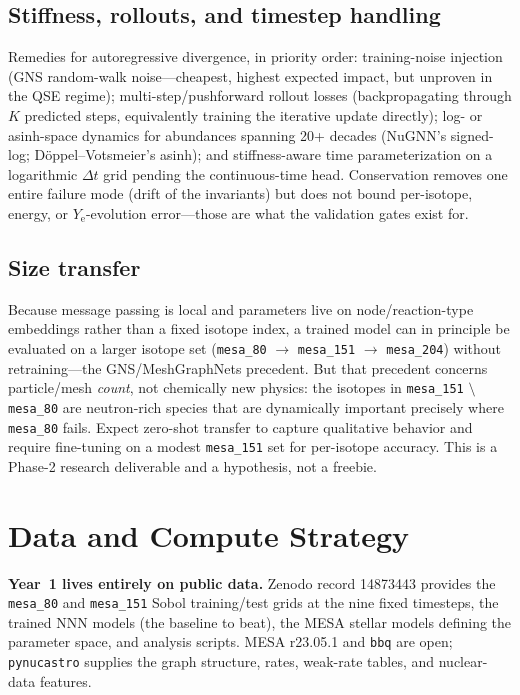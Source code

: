 \documentclass[11pt,a4paper]{article}
\newcommand{\Ye}{\ensuremath{Y_{\mathrm{e}}}}
\newcommand{\code}[1]{\texttt{#1}}
\begin{document}
\subsection{Stiffness, rollouts, and timestep handling}

Remedies for autoregressive divergence, in priority order: training-noise injection (GNS random-walk noise---cheapest, highest expected impact, but unproven in the QSE regime); multi-step/pushforward rollout losses (backpropagating through $K$ predicted steps, equivalently training the iterative update directly); log- or asinh-space dynamics for abundances spanning 20+ decades (NuGNN's signed-log; D\"oppel--Votsmeier's asinh); and stiffness-aware time parameterization on a logarithmic $\Delta t$ grid pending the continuous-time head. Conservation removes one entire failure mode (drift of the invariants) but does not bound per-isotope, energy, or \Ye-evolution error---those are what the validation gates exist for.

\subsection{Size transfer}

Because message passing is local and parameters live on node/reaction-type embeddings rather than a fixed isotope index, a trained model can in principle be evaluated on a larger isotope set (\code{mesa\_80} $\to$ \code{mesa\_151} $\to$ \code{mesa\_204}) without retraining---the GNS/MeshGraphNets precedent. But that precedent concerns particle/mesh \emph{count}, not chemically new physics: the isotopes in \code{mesa\_151} $\setminus$ \code{mesa\_80} are neutron-rich species that are dynamically important precisely where \code{mesa\_80} fails. Expect zero-shot transfer to capture qualitative behavior and require fine-tuning on a modest \code{mesa\_151} set for per-isotope accuracy. This is a Phase-2 research deliverable and a hypothesis, not a freebie.

\section{Data and Compute Strategy}

\textbf{Year~1 lives entirely on public data.} Zenodo record 14873443 provides the \code{mesa\_80} and \code{mesa\_151} Sobol training/test grids at the nine fixed timesteps, the trained NNN models (the baseline to beat), the MESA stellar models defining the parameter space, and analysis scripts. MESA r23.05.1 and \code{bbq} are open; \code{pynucastro} supplies the graph structure, rates, weak-rate tables, and nuclear-data features.
\end{document}
